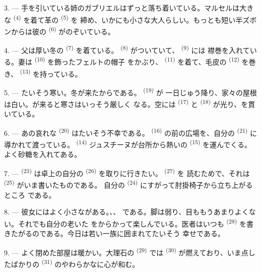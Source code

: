 3. --- 手を引いている姉のガブリエルはずっと落ち着いている。マルセルは大きな
 \textsuperscript{(4)} を着て革の \textsuperscript{(5)} を
締め、いかにも小さな大人らしい。もっとも短い半ズボンからは彼の
\textsuperscript{(6)} がのぞいている。

4. --- 父は厚い冬の \textsuperscript{(7)} を着ている。 \textsuperscript{(8)} がついていて、 \textsuperscript{(9)} には
襟巻を入れている。妻は \textsuperscript{(10)} を飾ったフェルトの帽子
をかぶり、 \textsuperscript{(11)} を着て、毛皮の
\textsuperscript{(12)} を巻き、 \textsuperscript{(13)} を持っている。

5. --- たいそう寒い。冬が来たからである。 \textsuperscript{(19)} が
一日じゅう降り、家々の屋根は白い。が来ると寒さはいっそう厳しく
なる。空には \textsuperscript{(17)} と \textsuperscript{(18)}
が光り、を貫いている。

\VUsaut{4.2mm}
\VUsaut{3.0mm}

6. --- あの哀れな \textsuperscript{(20)} はたいそう不幸である。
 \textsuperscript{(16)} の前の広場を、自分の
\textsuperscript{(21)} に導かれて渡っている。 \textsuperscript{(14)}
ジュスチーヌが台所から熱いの \textsuperscript{(15)}
を運んでくる。よく砂糖を入れてある。

7. ---  \textsuperscript{(23)} は卓上の自分の
\textsuperscript{(26)} を取りに行きたい。 \textsuperscript{(27)} を
読むためで、それは \textsuperscript{(25)} がいま書いたものである。
自分の \textsuperscript{(24)} にすがって肘掛椅子から立ち上がるところ
である。

8. --- 彼女にはよく小さながある。、、
である。脚は弱り、目ももうあまりよくない。それでも自分の老いた
をからかって楽しんでいる。医者はいつも
\textsuperscript{(28)} を書きたがるのである。今日は若い一族に囲まれてたいそう
幸せである。

9. --- よく閉めた部屋は暖かい。大理石の \textsuperscript{(29)} では
 \textsuperscript{(30)} が燃えており、いま点したばかりの
 \textsuperscript{(31)} のやわらかなに心が和む。

